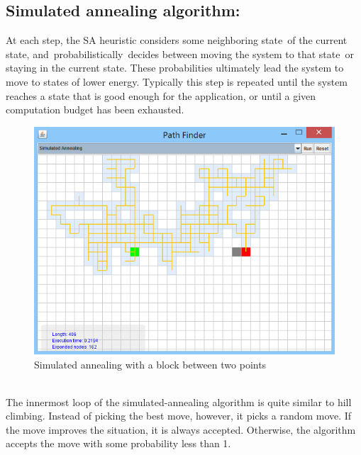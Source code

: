 \documentclass[a4paper]{article}
\begin{document}

\subsection{Simulated annealing algorithm:}

At each step, the SA heuristic considers some neighboring state of the current state, and probabilistically decides between moving the system to that state or staying in the current state. These probabilities ultimately lead the system to move to states of lower energy. Typically this step is repeated until the system reaches a state that is good enough for the application, or until a given computation budget has been exhausted. \\

\begin{figure}[h!]
  \centering
    \includegraphics[scale=.9]{images/sa1.png}
  \caption{Simulated annealing with a block between two points}
\end{figure}

\noindent \\
The innermost loop of the simulated-annealing algorithm is quite similar to hill climbing. Instead of picking the best move, however, it picks a random move. If the move improves the situation, it is always accepted. Otherwise, the algorithm accepts the move with some probability less than 1.
\end{document}
